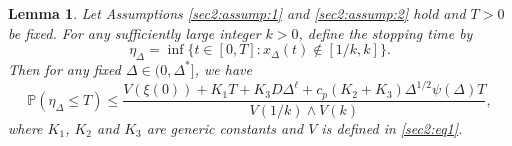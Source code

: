 \documentclass[10pt,a4paper]{amsart}
\newtheorem{lemma}{Lemma}
\begin{document}
\begin{lemma}\label{sub3}
Let Assumptions \ref{sec2:assump:1} and \ref{sec2:assump:2}  hold and $T>0$ be fixed. For any sufficiently large integer $k>0$, define the stopping time by
\begin{equation}\label{sec5:eq:tau}
\eta_{\Delta}=\inf\{t\in [0,T]:x_{\Delta}(t)\notin [1/k,k]\}.
\end{equation}
Then for any fixed $\Delta\in(0,\Delta^*]$, we have
\begin{equation}\label{probability2}
 \mathbb{P}(\eta_{\Delta}\leq T)\leq \frac{V(\xi(0))+K_1T+K_3D\Delta^{\ell}+c_p(K_2+K_3)\Delta^{1/2}\psi(\Delta)T}{V(1/k)\wedge V(k)},
\end{equation}
where  $K_1$, $K_2$ and $K_3$ are generic constants and $V$ is defined in \eqref{sec2:eq1}.
\end{lemma}
\end{document}
